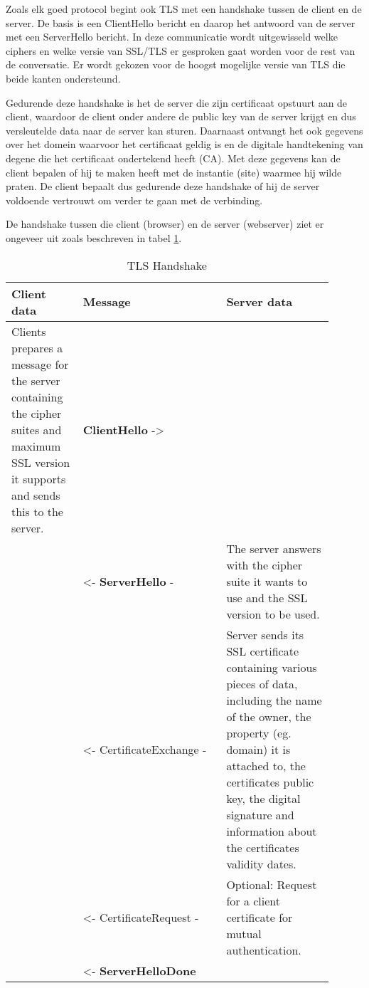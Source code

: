 Zoals elk goed protocol begint ook TLS met een handshake tussen de client en de server. De basis is een ClientHello bericht en daarop het antwoord van de server met een ServerHello bericht. In deze communicatie wordt uitgewisseld welke ciphers en welke versie van SSL/TLS er gesproken gaat worden voor de rest van de conversatie. Er wordt gekozen voor de hoogst mogelijke versie van TLS die beide kanten ondersteund.

Gedurende deze handshake is het de server die zijn certificaat opstuurt aan de client, waardoor de client onder andere de public key van de server krijgt en dus versleutelde data naar de server kan sturen. Daarnaast ontvangt het ook gegevens over het domein waarvoor het certificaat geldig is en de digitale handtekening van degene die het certificaat ondertekend heeft (CA). Met deze gegevens kan de client bepalen of hij te maken heeft met de instantie (site) waarmee hij wilde praten. De client bepaalt dus gedurende deze handshake of hij de server voldoende vertrouwt om verder te gaan met de verbinding.

De handshake tussen die client (browser) en de server (webserver) ziet er ongeveer uit zoals beschreven in tabel \ref{table:TLSHandshake}.

\begin{flushleft}
\begin{table}[h!]
\centering
	\begin{tabularx}{\linewidth}{ |p{0.2\linewidth} p{0.4\linewidth} p{0.3\linewidth}| }
\hline
	Client data &
	Message &
	Server data\\
\hline
	Clients prepares a message for the server containing the cipher suites and maximum SSL version it supports and sends this to the server. &
	\textbf{ClientHello} -> &
	\\
	&
	<- \textbf{ServerHello} - &
	The server answers with the cipher suite it wants to use and the SSL version to be used.\\
	&
	<- CertificateExchange - &
	Server sends its SSL certificate containing various pieces of data, including the name of the owner, the property (eg. domain) it is attached to, the certificates public key, the digital signature and information about the certificates validity dates. \\
	&
	<- CertificateRequest - &
	Optional: Request for a client certificate for mutual authentication. \\
	&
	<- \textbf{ServerHelloDone} &
	\\
\hline
	\end{tabularx}
	\caption{TLS Handshake}
	\label{table:TLSHandshake}
\end{table}
\end{flushleft}

